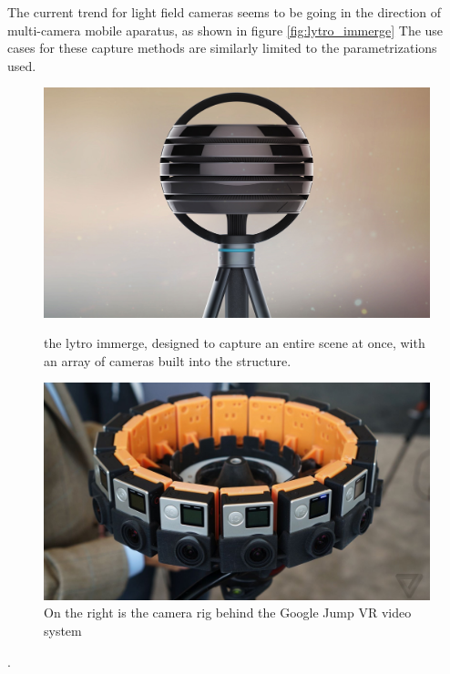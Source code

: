 \documentclass[12pt]{report}
\begin{document}
The current trend for light field cameras seems to be going in the direction of multi-camera mobile aparatus, as shown in figure \ref{fig:lytro_immerge}
The use cases for these capture methods are similarly limited to the parametrizations used.
\begin{figure}[!ht]
	\centering
	\begin{minipage}{0.45\textwidth}
		\centering
		\includegraphics[scale=0.08]{lytro_immerge.jpg}
		\caption{the lytro immerge, designed to capture an entire scene at once, with an array of cameras built into the structure.}
		\label{fig:lytro_immerge}
	\end{minipage}\hfill
	\begin{minipage}{0.45\textwidth}
		\centering
		\includegraphics[scale=0.12]{jump_vr_video_cameras.jpg}
		\caption{On the right is the camera rig behind the Google Jump VR video system \cite{Anderson16}}
		\label{fig:jump_cameras}
	\end{minipage}
\end{figure}. 
\end{document}
